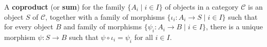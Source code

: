 \begin{definition}
A \textbf{coproduct} (or \textbf{sum}) for the family $\{A_i \mid i \in I\}$ of objects in a category $\mathcal{C}$ is an object $S$ of $\mathcal{C}$, together with a family of morphisms $\{\iota_i : A_i \rightarrow S \mid i \in I\}$ such that for every object $B$ and family of morphisms $\{\psi_i : A_i \rightarrow B \mid i \in I\}$, there is a unique morphism $\psi : S \rightarrow B$ such that $\psi \circ \iota_i = \psi_i$ for all $i \in I$.
\end{definition}
